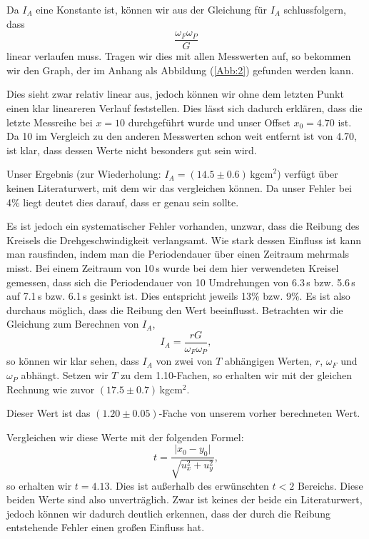 \documentclass[11pt,a4paper]{article}
\begin{document}
Da $I_A$ eine Konstante ist, k\"onnen wir aus der Gleichung f\"ur $I_A$ schlussfolgern, dass
\[\frac{\omega_F\omega_P}{G}\]
linear verlaufen muss. Tragen wir dies mit allen Messwerten auf, so bekommen wir den Graph, der im Anhang als Abbildung (\ref{Abb:2}) gefunden werden kann.

Dies sieht zwar relativ linear aus, jedoch k\"onnen wir ohne dem letzten Punkt einen klar lineareren Verlauf feststellen. Dies l\"asst sich dadurch erkl\"aren, dass die letzte Messreihe bei $x=10$ durchgef\"uhrt wurde und unser Offset $x_0=4.70$ ist. Da 10 im Vergleich zu den anderen Messwerten schon weit entfernt ist von 4.70, ist klar, dass dessen Werte nicht besonders gut sein wird.

Unser Ergebnis (zur Wiederholung: $I_A=(14.5\pm0.6)\,\mathrm{kgcm}^2$) verf\"ugt \"uber keinen Literaturwert, mit dem wir das vergleichen k\"onnen. Da unser Fehler bei 4\% liegt deutet dies darauf, dass er genau sein sollte.

Es ist jedoch ein systematischer Fehler vorhanden, unzwar, dass die Reibung des Kreisels die Drehgeschwindigkeit verlangsamt. Wie stark dessen Einfluss ist kann man rausfinden, indem man die Periodendauer \"uber einen Zeitraum mehrmals misst. 
Bei einem Zeitraum von 10\,s wurde bei dem hier verwendeten Kreisel gemessen, dass sich die Periodendauer von 10 Umdrehungen von 6.3\,s bzw. 5.6\,s auf 7.1\,s bzw. 6.1\,s gesinkt ist. Dies entspricht jeweils 13\% bzw. 9\%. Es ist also durchaus m\"oglich, dass die Reibung den Wert beeinflusst. Betrachten wir die Gleichung zum Berechnen von $I_A$,
\[
I_A=\frac{rG}{\omega_F\omega_P},
\]
so k\"onnen wir klar sehen, dass $I_A$ von zwei von $T$ abh\"angigen Werten, $r$, $\omega_F$ und $\omega_P$ abh\"angt. Setzen wir $T$ zu dem 1.10-Fachen, so erhalten wir mit der gleichen Rechnung wie zuvor $(17.5\pm0.7)$\,kgcm$^{2}$.

Dieser Wert ist das $(1.20\pm0.05)$-Fache von unserem vorher berechneten Wert.

Vergleichen wir diese Werte mit der folgenden Formel:
\begin{equation}
t=\frac{\vert x_0-y_0\vert}{\sqrt{u_x^2+u_y^2}},\label{abw}
\end{equation}
so erhalten wir $t=4.13$. Dies ist au\ss erhalb des erw\"unschten $t<2$ Bereichs. Diese beiden Werte sind also unvertr\"aglich. Zwar ist keines der beide ein Literaturwert, jedoch k\"onnen wir dadurch deutlich erkennen, dass der durch die Reibung entstehende Fehler einen gro\ss en Einfluss hat.
\end{document}
